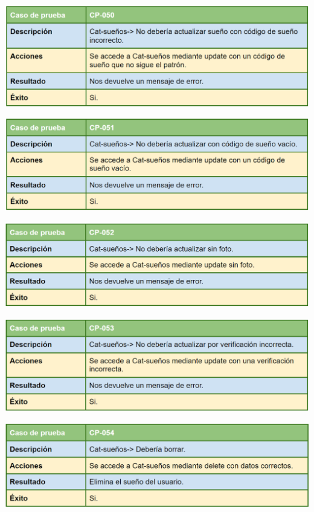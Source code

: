 \bigskip

\includegraphics[width=\textwidth]{img/cap7/cp-050.png}

\bigskip

\includegraphics[width=\textwidth]{img/cap7/cp-051.png}

\bigskip

\includegraphics[width=\textwidth]{img/cap7/cp-052.png}

\bigskip

\includegraphics[width=\textwidth]{img/cap7/cp-053.png}

\bigskip

\includegraphics[width=\textwidth]{img/cap7/cp-054.png}

